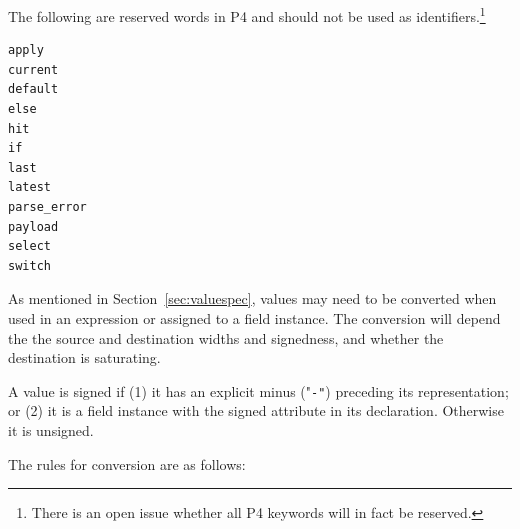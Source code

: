 \documentclass[12pt]{article}
\begin{document}


The following are reserved words in P4 and should not be used as identifiers.\footnote{There is an open issue whether all P4 keywords will in fact be reserved.}

\begin{Verbatim}[commandchars=\\\{\}]
apply
current
default
else
hit
if
last
latest
parse_error
payload
select
switch
\end{Verbatim}



As mentioned in Section~\ref{sec:valuespec}, values may need to be 
converted when used in an expression or assigned to a field instance. The 
conversion will depend the the source and destination widths and signedness, 
and whether the destination is saturating. 

A value is signed if (1) it has an explicit minus ("\texttt{-"}) preceding its representation; 
or (2) it is a field instance with the signed attribute in its declaration. 
Otherwise it is unsigned.

The rules for conversion are as follows:
\end{document}
